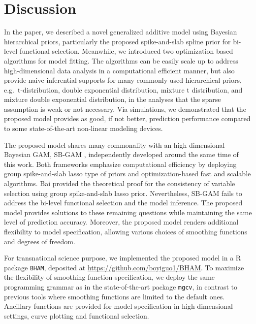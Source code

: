 \documentclass[AMA,STIX1COL,]{WileyNJD-v2}
\begin{document}
\hypertarget{discussion}{%
\section{Discussion}\label{discussion}}

\label{sec:concl} In the paper, we described a novel generalized
additive model using Bayesian hierarchical priors, particularly the
proposed spike-and-slab spline prior for bi-level functional selection.
Meanwhile, we introduced two optimization based algorithms for model
fitting. The algorithms can be easily scale up to address
high-dimensional data analysis in a computational efficient manner, but
also provide naive inferential supports for many commonly used
hierarchical priors, e.g.~t-distribution, double exponential
distribution, mixture t distribution, and mixture double exponential
distribution, in the analyses that the sparse assumption is weak or not
necessary. Via simulations, we demonstrated that the proposed model
provides as good, if not better, prediction performance compared to some
state-of-the-art non-linear modeling devices.

The proposed model shares many commonality with an high-dimensional
Bayesian GAM, SB-GAM \citep{Bai2021}, independently developed around the
same time of this work. Both frameworks emphasize computational
efficiency by deploying group spike-and-slab lasso type of priors and
optimization-based fast and scalable algorithms. Bai provided the
theoretical proof for the consistency of variable selection using group
spike-and-slab lasso prior. Nevertheless, SB-GAM fails to address the
bi-level functional selection and the model inference. The proposed
model provides solutions to these remaining questions while maintaining
the same level of prediction accuracy. Moreover, the proposed model
renders additional flexibility to model specification, allowing various
choices of smoothing functions and degrees of freedom.

For transnational science purpose, we implemented the proposed model in
a R package \texttt{BHAM}, deposited at
\url{https://github.com/boyiguo1/BHAM}. To maximize the flexibility of
smoothing function specification, we deploy the same programming grammar
as in the state-of-the-art package \texttt{mgcv}, in contrast to
previous tools where smoothing functions are limited to the default
ones. Ancillary functions are provided for model specification in
high-dimensional settings, curve plotting and functional selection.
\end{document}
